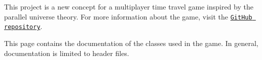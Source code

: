 This project is a new concept for a multiplayer time travel game inspired by the parallel universe theory. For more information about the game, visit the \href{https://github.com/JubilantJerry/Antitelephone}{\tt Git\+Hub repository}.

This page contains the documentation of the classes used in the game. In general, documentation is limited to header files. 